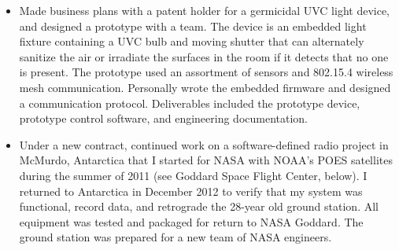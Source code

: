 \documentclass[10pt,letterpaper]{article}
\begin{document}
\begin{itemize}
\begin{itemize}
		\item Made business plans with a patent holder for a germicidal UVC light device, and designed a prototype with a team. The device is an embedded light fixture containing a UVC bulb and moving shutter that can alternately sanitize the air or irradiate the surfaces in the room if it detects that no one is present.  The prototype used an assortment of sensors and 802.15.4 wireless mesh communication.  Personally wrote the embedded firmware and designed a communication protocol.  Deliverables included the prototype device, prototype control software, and engineering documentation.
		\item Under a new contract, continued work on a software-defined radio project in McMurdo, Antarctica that I started for NASA with NOAA's POES satellites during the summer of 2011 (see Goddard Space Flight Center, below).  I returned to Antarctica in December 2012 to verify that my system was functional, record data, and retrograde the 28-year old ground station.  All equipment was tested and packaged for return to NASA Goddard.  The ground station was prepared for a new team of NASA engineers.
	\end{itemize}


\end{itemize}
\end{document}
